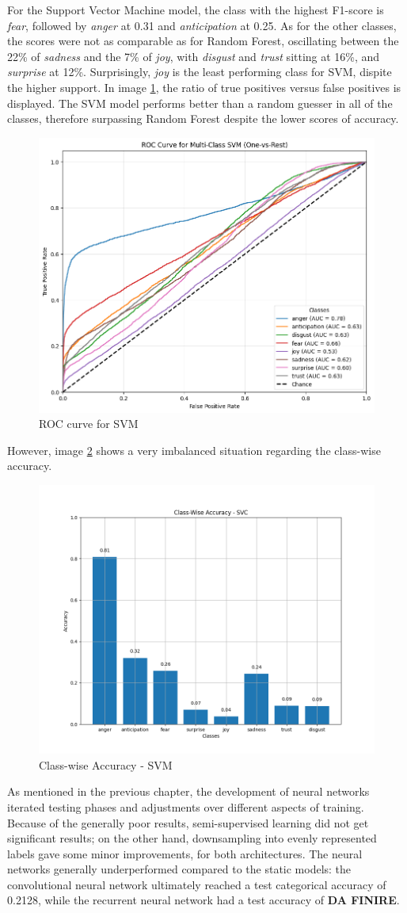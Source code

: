 For the Support Vector Machine model, the class with the highest F1-score is \textit{fear}, followed by \textit{anger} at 0.31 and \textit{anticipation} at 0.25. As for the other classes, the scores were not as comparable as for Random Forest, oscillating between the 22\% of \textit{sadness} and the 7\% of \textit{joy}, with \textit{disgust} and \textit{trust} sitting at 16\%, and \textit{surprise} at 12\%. Surprisingly, \textit{joy} is the least performing class for SVM, dispite the higher support.   
In image \ref{fig:roc_svc}, the ratio of true positives versus false positives is displayed. The SVM model performs better than a random guesser in all of the classes, therefore surpassing Random Forest despite the lower scores of accuracy. 

\begin{figure}[!h]
    \centering
    \includegraphics[width=0.5\linewidth]{pictures/roc_svc.png}
    \caption{ROC curve for SVM}
    \label{fig:roc_svc}
\end{figure}
However, image \ref{fig:acc_svc} shows a very imbalanced situation regarding the class-wise accuracy.
\begin{figure}
      \centering
      \includegraphics[width=0.5\linewidth]{pictures/class_accuracy_SVC.png}
      \caption{Class-wise Accuracy - SVM}
      \label{fig:acc_svc}
\end{figure}


As mentioned in the previous chapter, the development of neural networks
iterated testing phases and adjustments over different aspects of training.
Because of the generally poor results, semi-supervised learning did not get
significant results; on the other hand, downsampling into evenly represented
labels gave some minor improvements, for both architectures.
The neural networks generally underperformed compared to the static models:
the convolutional neural network ultimately reached a test categorical accuracy
of 0.2128, while the recurrent neural network had a test accuracy of \textbf{DA FINIRE}.\\

